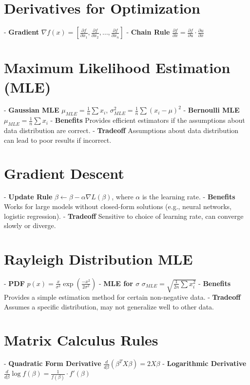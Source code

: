 \documentclass[10pt]{article}
\begin{document}
\begin{multicols}{2}
\section*{Derivatives for Optimization}
- \textbf{Gradient} $\nabla f(x) = \left[\frac{\partial f}{\partial x_1}, \frac{\partial f}{\partial x_2}, \dots, \frac{\partial f}{\partial x_n}\right]$
- \textbf{Chain Rule} $\frac{\partial f}{\partial x} = \frac{\partial f}{\partial u} \cdot \frac{\partial u}{\partial x}$

\section*{Maximum Likelihood Estimation (MLE)}
- \textbf{Gaussian MLE} $\mu_{MLE} = \frac{1}{n} \sum x_i$, \quad $\sigma_{MLE}^2 = \frac{1}{n} \sum (x_i - \mu)^2$
- \textbf{Bernoulli MLE} $\mu_{MLE} = \frac{1}{n} \sum x_i$
- \textbf{Benefits} Provides efficient estimators if the assumptions about data distribution are correct.
- \textbf{Tradeoff} Assumptions about data distribution can lead to poor results if incorrect.

\section*{Gradient Descent}
- \textbf{Update Rule} $\beta \leftarrow \beta - \alpha\nabla L(\beta)$, where $\alpha$ is the learning rate.
- \textbf{Benefits} Works for large models without closed-form solutions (e.g., neural networks, logistic regression).
- \textbf{Tradeoff} Sensitive to choice of learning rate, can converge slowly or diverge.

\section*{Rayleigh Distribution MLE}
- \textbf{PDF} $p(x) = \frac{x}{\sigma^2} \exp\left( \frac{-x^2}{2\sigma^2} \right)$
- \textbf{MLE for $\sigma$} $\sigma_{MLE} = \sqrt{\frac{1}{2n} \sum x_i^2}$
- \textbf{Benefits} Provides a simple estimation method for certain non-negative data.
- \textbf{Tradeoff} Assumes a specific distribution, may not generalize well to other data.

\section*{Matrix Calculus Rules}
- \textbf{Quadratic Form Derivative} $\frac{d}{d\beta} \left( \beta^T X \beta \right) = 2X\beta$
- \textbf{Logarithmic Derivative} $\frac{d}{d\beta} \log f(\beta) = \frac{1}{f(\beta)} \cdot f'(\beta)$


\end{multicols}
\end{document}
